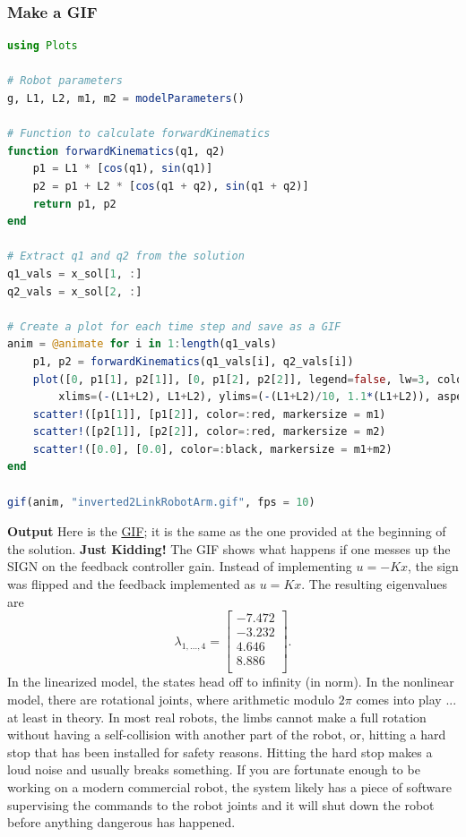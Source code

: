 \subsubsection{Make a GIF}

\begin{lstlisting}[language=Julia,style=mystyle]
using Plots

# Robot parameters
g, L1, L2, m1, m2 = modelParameters()

# Function to calculate forwardKinematics
function forwardKinematics(q1, q2)
    p1 = L1 * [cos(q1), sin(q1)]
    p2 = p1 + L2 * [cos(q1 + q2), sin(q1 + q2)]
    return p1, p2
end

# Extract q1 and q2 from the solution
q1_vals = x_sol[1, :]
q2_vals = x_sol[2, :]

# Create a plot for each time step and save as a GIF
anim = @animate for i in 1:length(q1_vals)
    p1, p2 = forwardKinematics(q1_vals[i], q2_vals[i])
    plot([0, p1[1], p2[1]], [0, p1[2], p2[2]], legend=false, lw=3, color=:blue,
        xlims=(-(L1+L2), L1+L2), ylims=(-(L1+L2)/10, 1.1*(L1+L2)), aspect_ratio=1)
    scatter!([p1[1]], [p1[2]], color=:red, markersize = m1)
    scatter!([p2[1]], [p2[2]], color=:red, markersize = m2)
    scatter!([0.0], [0.0], color=:black, markersize = m1+m2)
end

gif(anim, "inverted2LinkRobotArm.gif", fps = 10)
\end{lstlisting}
\textbf{Output} 
Here is the \href{https://www.dropbox.com/scl/fi/ftjk3moa019basvk4zv8o/inverted2LinkRobotArmDeliberatelyDestabilized.gif?rlkey=ledhzmp2u06kv1p15y839v9w9&dl=0}{GIF}; it is the same as the one provided at the beginning of the solution. \textbf{Just Kidding!} The GIF shows what happens if one messes up the SIGN on the feedback controller gain. Instead of implementing $u = -K x$, the sign was flipped and the feedback implemented as $u=Kx$. The resulting eigenvalues are 
$$\lambda_{1,...,4} = \left[
\begin{array}{r}
-7.472 \\
-3.232 \\
4.646 \\
8.886 \\
\end{array}
\right].$$
In the linearized model, the states head off to infinity (in norm). In the nonlinear model, there are rotational joints, where arithmetic modulo $2 \pi$ comes into play ... at least in theory. In most real robots, the limbs cannot make a full rotation without having a self-collision with another part of the robot, or, hitting a hard stop that has been installed for safety reasons. Hitting the hard stop makes a loud noise and usually breaks something. If you are fortunate enough to be working on a modern commercial robot, the system likely has a piece of software supervising the commands to the robot joints and it will shut down the robot before anything dangerous has happened.

